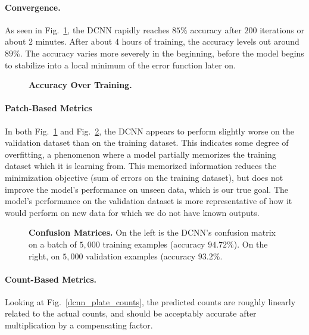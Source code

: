 \documentclass[10pt,letterpaper]{article}
\begin{document}
        \paragraph*{Convergence.}
            As seen in Fig.~\ref{dcnn_convergence}, the DCNN rapidly reaches $85\%$ accuracy after $200$ iterations or about $2$ minutes. After about $4$ hours of training, the accuracy levels out around $89\%$. The accuracy varies more severely in the beginning, before the model begins to stabilize into a local minimum of the error function later on.
            
            \begin{figure}[h]
                
                \caption{{\bf Accuracy Over Training.}}
                \label{dcnn_convergence}
            \end{figure}
        
        \paragraph*{Patch-Based Metrics}
            In both Fig.~\ref{dcnn_convergence} and Fig.~\ref{dcnn_confusion}, the DCNN appears to perform slightly worse on the validation dataset than on the training dataset. This indicates some degree of overfitting, a phenomenon where a model partially memorizes the training dataset which it is learning from. This memorized information reduces the minimization objective (sum of errors on the training dataset), but does not improve the model's performance on unseen data, which is our true goal. The model's performance on the validation dataset is more representative of how it would perform on new data for which we do not have known outputs.
            
            \begin{figure}[h]
                
                
                \caption{{\bf Confusion Matrices.} On the left is the DCNN's confusion matrix on a batch of $5,000$ training examples (accuracy $94.72\%$). On the right, on $5,000$ validation examples (accuracy $93.2\%$.}
                \label{dcnn_confusion}
            \end{figure}
        
        \paragraph*{Count-Based Metrics.}             
            Looking at Fig.~\ref{dcnn_plate_counts}, the predicted counts are roughly linearly related to the actual counts, and should be acceptably accurate after multiplication by a compensating factor.
            
\end{document}
